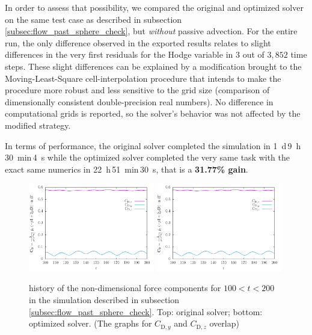\documentclass[11pt, a4paper]{article}
\theoremstyle{remark}
\begin{document}
In order to assess that possibility, we compared the original and optimized solver on the same test case as described in subsection \ref{subsec:flow_past_sphere_check}, but \emph{without} passive advection. For the entire run, the only difference observed in the exported results relates to slight differences in the very first residuals for the Hodge variable in $3$ out of $3,852$ time steps. These slight differences can be explained by a modification brought to the Moving-Least-Square cell-interpolation procedure that intends to make the procedure more robust and less sensitive to the grid size (comparison of dimensionally consistent double-precision real numbers). No difference in computational grids is reported, so the solver's behavior was not affected by the modified strategy.

In terms of performance, the original solver completed the simulation in \SI{1}{\day}\,\SI{9}{\hour}\,\SI{30}{\minute}\,\SI{4}{\second} while the optimized solver completed the very same task with the exact same numerics in \SI{22}{\hour}\,\SI{51}{\minute}\,\SI{30}{\second}, that is a \textbf{31.77\% gain}.

\begin{figure}
  \centering
  \includegraphics[width=0.49\textwidth]{./results/flow_past_sphere_smoke/reference/force_history.pdf}
  \includegraphics[width=0.49\textwidth]{./results/flow_past_sphere_smoke/optimized_run/force_history.pdf}
 \caption{\label{fig:forces_flow_past_sphere_check_unchanged} history of the non-dimensional force components for $100 < t < 200$ in the simulation described in subsection \ref{subsec:flow_past_sphere_check}. Top: original solver; bottom: optimized solver. (The graphs for $C_{\mathrm{D}, y}$ and $C_{\mathrm{D}, z}$ overlap)} 
\end{figure}
\end{document}
